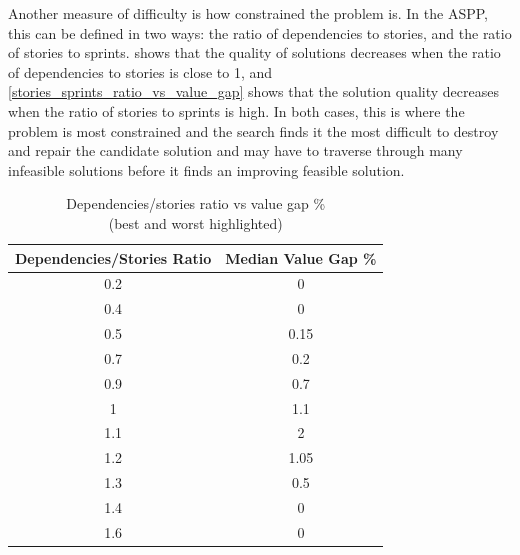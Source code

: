 Another measure of difficulty is how constrained the problem is. In the ASPP, this can be defined in two ways: the ratio of dependencies to stories, and the ratio of stories to sprints.  shows that the quality of solutions decreases when the ratio of dependencies to stories is close to 1, and \cref{stories_sprints_ratio_vs_value_gap} shows that the solution quality decreases when the ratio of stories to sprints is high. In both cases, this is where the problem is most constrained and the search finds it the most difficult to destroy and repair the candidate solution and may have to traverse through many infeasible solutions before it finds an improving feasible solution.

\begin{table}[h!]
\centering
\caption{Dependencies/stories ratio vs value gap \%\\(best and worst highlighted)}
\label{dependencies_stories_ratio_vs_value_gap}
\begin{tabular}{|c|c|}
\hline
\textbf{Dependencies/Stories Ratio} & \textbf{Median Value Gap \%} \\ \hline
\rowcolor[HTML]{67FD9A} 
0.2 & 0 \\ \hline
\rowcolor[HTML]{67FD9A} 
0.4 & 0 \\ \hline
0.5 & 0.15 \\ \hline
0.7 & 0.2 \\ \hline
0.9 & 0.7 \\ \hline
1 & 1.1 \\ \hline
\rowcolor[HTML]{FD6864} 
1.1 & 2 \\ \hline
1.2 & 1.05 \\ \hline
1.3 & 0.5 \\ \hline
\rowcolor[HTML]{67FD9A} 
1.4 & 0 \\ \hline
\rowcolor[HTML]{67FD9A} 
1.6 & 0 \\ \hline
\end{tabular}
\end{table}

